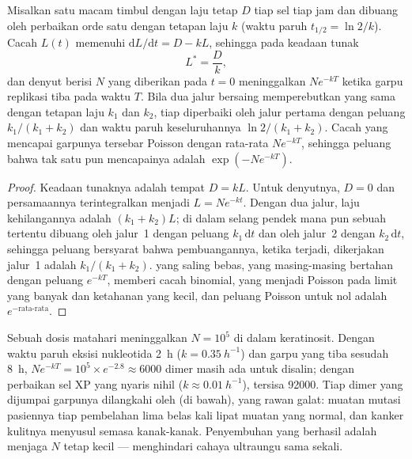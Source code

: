 \begin{theorem}\label{thm:b3:dna-repair:load}
Misalkan  satu macam timbul dengan laju tetap $D$ tiap sel tiap
jam dan dibuang oleh perbaikan orde satu dengan tetapan laju $k$
(waktu paruh $t_{1/2} = \ln 2/k$). Cacah  $L(t)$ memenuhi
$\mathrm{d}L/\mathrm{d}t = D - kL$, sehingga pada keadaan tunak
\[
L^{*} = \frac{D}{k},
\]
dan denyut berisi $N$  yang diberikan pada $t = 0$ meninggalkan
$N e^{-kT}$  ketika garpu replikasi tiba pada waktu $T$. Bila dua jalur
bersaing memperebutkan  yang sama dengan tetapan laju $k_{1}$ dan
$k_{2}$, tiap  diperbaiki oleh jalur pertama dengan peluang $k_{1}/(k_{1} +
k_{2})$ dan waktu paruh keseluruhannya $\ln 2/(k_{1} + k_{2})$. Cacah
 yang mencapai garpunya tersebar Poisson dengan rata-rata
$N e^{-kT}$, sehingga peluang bahwa tak satu pun mencapainya adalah $\exp(-N e^{-kT})$.
\end{theorem}
\begin{proof}
Keadaan tunaknya adalah tempat $D = kL$. Untuk denyutnya, $D = 0$ dan
persamaannya terintegralkan menjadi $L = N e^{-kt}$. Dengan dua jalur, laju
kehilangannya adalah $(k_{1} + k_{2})L$; di dalam selang pendek mana pun
sebuah  tertentu dibuang oleh jalur~1 dengan peluang $k_{1}\,\mathrm{d}t$
dan oleh jalur~2 dengan $k_{2}\,\mathrm{d}t$, sehingga peluang bersyarat bahwa
pembuangannya, ketika terjadi, dikerjakan jalur~1 adalah $k_{1}/(k_{1} +
k_{2})$.  yang saling bebas, yang masing-masing bertahan dengan peluang
$e^{-kT}$, memberi cacah binomial, yang menjadi Poisson pada limit  yang
banyak dan ketahanan yang kecil, dan peluang Poisson untuk nol adalah
$e^{-\text{rata-rata}}$.
\end{proof}

\begin{example}\label{ex:b3:dna-repair:xp}
Sebuah dosis matahari meninggalkan $N = 10^{5}$  di dalam
keratinosit. Dengan waktu paruh eksisi nukleotida \qty{2}{h} ($k =
\qty{0.35}{h^{-1}}$) dan garpu yang tiba sesudah \qty{8}{h}, $N e^{-kT} =
10^{5}\times e^{-2.8} \approx 6000$ dimer masih ada untuk disalin; dengan
perbaikan sel XP yang nyaris nihil ($k \approx
\qty{0.01}{h^{-1}}$), tersisa \num{92000}. Tiap dimer yang dijumpai garpunya
dilangkahi oleh  (di bawah), yang rawan galat: muatan
mutasi pasiennya tiap pembelahan lima belas kali lipat muatan yang normal,
dan kanker kulitnya menyusul semasa kanak-kanak. Penyembuhan yang berhasil
adalah menjaga $N$ tetap kecil --- menghindari cahaya ultraungu sama sekali.
\end{example}

